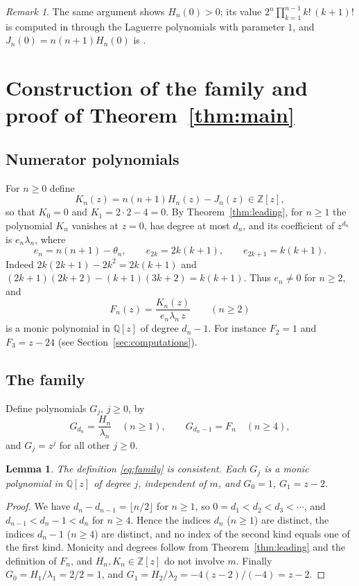 \documentclass[11pt]{amsart}
\newtheorem{lemma}[theorem]{Lemma}
\theoremstyle{remark}
\newtheorem{remark}[theorem]{Remark}
\numberwithin{equation}{section}
\newcommand{\Z}{\mathbb{Z}}
\newcommand{\Q}{\mathbb{Q}}
\begin{document}
\begin{remark}
The same argument shows $H_n(0)>0$; its value $2^n\prod_{k=1}^{n-1}k!\,(k+1)!$ is computed in \cite[(2.7)]{MC} through the Laguerre polynomials with parameter $1$, and $J_n(0)=n(n+1)H_n(0)$ is \cite[(2.8)]{MC}.
\end{remark}

\section{Construction of the family and proof of Theorem~\ref{thm:main}}\label{sec:proof}

\subsection{Numerator polynomials}
For $n\ge0$ define
\[
K_n(z)=n(n+1)H_n(z)-J_n(z)\in\Z[z],
\]
so that $K_0=0$ and $K_1=2\cdot2-4=0$. By Theorem~\ref{thm:leading}, for $n\ge1$ the polynomial $K_n$ vanishes at $z=0$, has degree at most $d_n$, and its coefficient of $z^{d_n}$ is $e_n\lambda_n$, where
\[
e_n=n(n+1)-\theta_n,\qquad e_{2k}=2k(k+1),\qquad e_{2k+1}=k(k+1).
\]
Indeed $2k(2k+1)-2k^2=2k(k+1)$ and $(2k+1)(2k+2)-(k+1)(3k+2)=k(k+1)$. Thus $e_n\ne0$ for $n\ge2$, and
\[
F_n(z)=\frac{K_n(z)}{e_n\lambda_n\,z}\qquad(n\ge2)
\]
is a monic polynomial in $\Q[z]$ of degree $d_n-1$. For instance $F_2=1$ and $F_3=z-24$ (see Section~\ref{sec:computations}).

\subsection{The family}
Define polynomials $G_j$, $j\ge0$, by
\begin{equation}\label{eq:family}
G_{d_n}=\frac{H_n}{\lambda_n}\quad(n\ge1),\qquad G_{d_n-1}=F_n\quad(n\ge4),
\end{equation}
and $G_j=z^j$ for all other $j\ge0$.

\begin{lemma}\label{lem:family}
The definition \eqref{eq:family} is consistent. Each $G_j$ is a monic polynomial in $\Q[z]$ of degree $j$, independent of $m$, and $G_0=1$, $G_1=z-2$.
\end{lemma}

\begin{proof}
We have $d_n-d_{n-1}=\lfloor n/2\rfloor$ for $n\ge1$, so $0=d_1<d_2<d_3<\cdots$, and $d_{n-1}<d_n-1<d_n$ for $n\ge4$. Hence the indices $d_n$ ($n\ge1$) are distinct, the indices $d_n-1$ ($n\ge4$) are distinct, and no index of the second kind equals one of the first kind. Monicity and degrees follow from Theorem~\ref{thm:leading} and the definition of $F_n$, and $H_n,K_n\in\Z[z]$ do not involve $m$. Finally $G_0=H_1/\lambda_1=2/2=1$, and $G_1=H_2/\lambda_2=-4(z-2)/(-4)=z-2$.
\end{proof}
\end{document}

